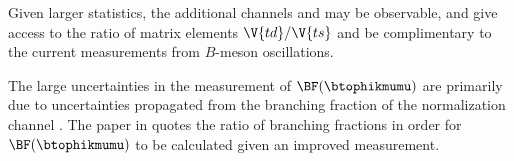 
Given larger statistics, the additional channels \decay{\Bp}{\Kp\Km\pip\mumu} and
\decay{\Bp}{\pip\pipi\mumu}
may be observable, and give access to the ratio of \ckm matrix elements $\V{td}/\V{ts}$ and be
complimentary to the current
measurements from $B$-meson oscillations.


The large uncertainties in the measurement of $\BF(\btophikmumu)$ are primarily due to
uncertainties propagated from the branching fraction of the normalization channel \btojpsiphik.
The paper in  quotes the ratio of branching fractions in order for
$\BF(\btophikmumu)$ to be calculated given an improved measurement.





